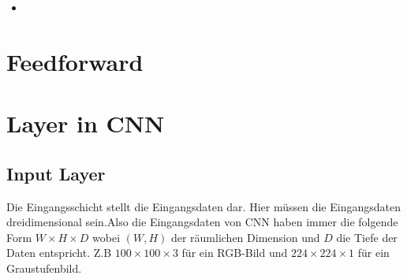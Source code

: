 \documentclass[12pt,a4paper]{scrartcl}
\numberwithin{equation}{section}
\begin{document}
\begin{itemize}
%	
%	
%	
%	
\item  
\end{itemize}





\section{Feedforward }
\section{Layer in \ac{CNN}}
\subsection{Input Layer}
Die Eingangsschicht stellt die Eingangsdaten dar. Hier müssen die Eingangsdaten dreidimensional sein.Also die Eingangsdaten von \ac{CNN}  haben immer die folgende Form $ W\times H\times D $ wobei $ (W, H) $ der räumlichen Dimension und $ D $ die Tiefe der Daten entspricht. Z.B  $ 100\times100 \times3 $ für ein RGB-Bild und $ 224\times224\times1 $ für ein Graustufenbild.
\end{document}
